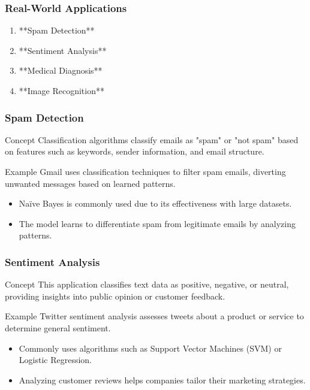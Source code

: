 \documentclass[aspectratio=169]{beamer}
\begin{document}
\begin{frame}
    \frametitle{Real-World Applications}
    \begin{enumerate}
        \item **Spam Detection**
        \item **Sentiment Analysis**
        \item **Medical Diagnosis**
        \item **Image Recognition**
    \end{enumerate}
\end{frame}

\begin{frame}
    \frametitle{Spam Detection}
    \begin{block}{Concept}
        Classification algorithms classify emails as "spam" or "not spam" based on features such as keywords, sender information, and email structure.
    \end{block}
    \begin{block}{Example}
        Gmail uses classification techniques to filter spam emails, diverting unwanted messages based on learned patterns.
    \end{block}
    \begin{itemize}
        \item Naïve Bayes is commonly used due to its effectiveness with large datasets.
        \item The model learns to differentiate spam from legitimate emails by analyzing patterns.
    \end{itemize}
\end{frame}

\begin{frame}
    \frametitle{Sentiment Analysis}
    \begin{block}{Concept}
        This application classifies text data as positive, negative, or neutral, providing insights into public opinion or customer feedback.
    \end{block}
    \begin{block}{Example}
        Twitter sentiment analysis assesses tweets about a product or service to determine general sentiment.
    \end{block}
    \begin{itemize}
        \item Commonly uses algorithms such as Support Vector Machines (SVM) or Logistic Regression.
        \item Analyzing customer reviews helps companies tailor their marketing strategies.
    \end{itemize}
\end{frame}
\end{document}
